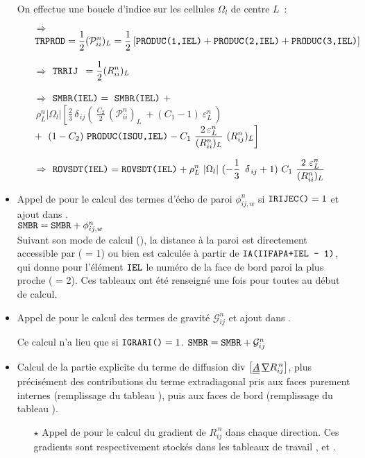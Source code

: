\begin{itemize}
On effectue une boucle d'indice  sur les cellules $\Omega_l$ de centre $L$~:
\begin{itemize}
\item [$\Rightarrow$] $\displaystyle \text{\texttt{TRPROD}}= \frac{1}{2} (\mathcal{P}^n_{ii})_L = \frac{1}{2} \left[ \text{\texttt{PRODUC(1,IEL)}} +  \text{\texttt{PRODUC(2,IEL)}} +  \text{\texttt{PRODUC(3,IEL)}} \right] $
\item [$\Rightarrow$] $\displaystyle \text{\texttt{TRRIJ }}= \frac{1}{2} (R^n_{ii})_L $
\item [$\Rightarrow$] $\displaystyle \var{SMBR(IEL)} =\ \var{SMBR(IEL)}\ +$\\
$\ \displaystyle\rho^n_L |\Omega_l| \left[ \displaystyle
\frac{2}{3}\,\delta_{\,ij} \left( \ \displaystyle \frac{ C_2}{2}\,(\mathcal{P}^n_{ii})_L\ +
(C_1-1)\ \varepsilon^n_L\, \right)\right.$\\
$ + \left.\ (1-C_2) \ \text{\texttt{PRODUC(ISOU,IEL)}} -
\displaystyle C_1\ \frac{2\,\varepsilon^n_L}{(R^n_{ii})_L}\ (R^n_{ij})_L \right]$
\item [$\Rightarrow$] $\displaystyle \text{\texttt{ROVSDT(IEL)}} = \text{\texttt{ROVSDT(IEL)}} +
\rho^n_L \ |\Omega_l| \ (- \displaystyle \frac{1}{3} \ \,\delta_{\,ij} + 1) \ C_1
\ \frac{2\ \varepsilon^n_L}{(R^n_{ii})_L}$
\end{itemize}
\item Appel de  pour le calcul des termes d'écho de paroi
 $\phi^n_{ij,w}$ si $\text{\texttt{IRIJEC()}}=1$ et ajout dans .\\
$\text{\texttt{SMBR}} = \text{\texttt{SMBR}} + \phi^n_{ij,w}$\\
Suivant son mode de calcul (), la distance à la paroi est directement accessible
par  ( = 1) ou bien
est calculée à partir de $\text{\texttt{IA(IIFAPA+IEL - 1)}}$,
qui donne pour l'élément $\text{\texttt{IEL}}$ le numéro de la face de bord
paroi la plus  proche ( = 2). Ces tableaux ont été renseigné une fois pour toutes au
début de calcul.

\item  Appel de  pour le calcul des termes de gravité $\mathcal{G}^n_{ij}$ et ajout dans .

Ce calcul n'a lieu que si $\text{\texttt{IGRARI()}} = 1$.
$ \text{\texttt{SMBR}} = \text{\texttt{SMBR}} + \mathcal{G}^n_{ij}$
\item Calcul de la partie explicite du terme de diffusion
 $\text{div}\,{\,\left[\underline{\underline{A}}\,\underline{\nabla}{R}^{\,n}_{ij}\right]}$, plus précisément
des contributions du terme extradiagonal pris aux faces purement internes
(remplissage du tableau ), puis aux faces de bord (remplissage du
tableau ).
\begin{itemize}
\item [$\star$] Appel de  pour le calcul du gradient de
$R^{\,n}_{ij}$ dans chaque direction. Ces gradients sont respectivement
stockés dans les tableaux de travail ,  et .


\end{itemize}
\end{itemize}
